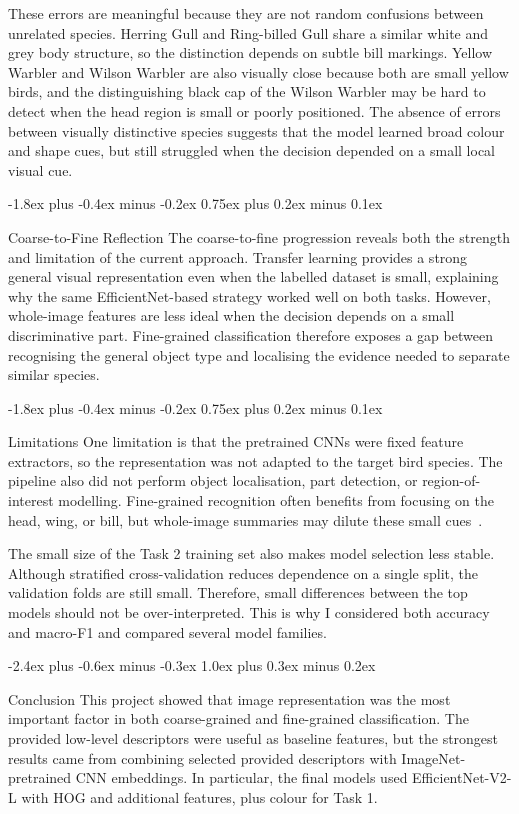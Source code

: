 \documentclass[11pt]{article}
\makeatletter
\renewcommand\section{%
    \@startsection{section}{1}{\z@}%
                  {-2.4ex plus -0.6ex minus -0.3ex}%
                  {1.0ex plus 0.3ex minus 0.2ex}%
                  {\large\bf\raggedright}}
\renewcommand\subsection{%
    \@startsection{subsection}{2}{\z@}%
                  {-1.8ex plus -0.4ex minus -0.2ex}%
                  {0.75ex plus 0.2ex minus 0.1ex}%
                  {\normalsize\bf\raggedright}}
\makeatother
\begin{document}
These errors are meaningful because they are not random confusions between
unrelated species. Herring Gull and Ring-billed Gull share a similar white and grey
body structure, so the distinction depends on subtle bill markings. Yellow Warbler
and Wilson Warbler are also visually close because both are small yellow birds, and
the distinguishing black cap of the Wilson Warbler may be hard to detect when the
head region is small or poorly positioned. The absence of errors between visually
distinctive species suggests that the model learned broad colour and shape cues,
but still struggled when the decision depended on a small local visual cue.

\subsection{Coarse-to-Fine Reflection}
The coarse-to-fine progression reveals both the strength and limitation of the
current approach. Transfer learning provides a strong general visual representation
even when the labelled dataset is small, explaining why the same EfficientNet-based
strategy worked well on both tasks. However, whole-image features are less ideal
when the decision depends on a small discriminative part. Fine-grained
classification therefore exposes a gap between recognising the general object type
and localising the evidence needed to separate similar species.


\subsection{Limitations}
One limitation is that the pretrained CNNs were fixed feature extractors, so the
representation was not adapted to the target bird species. The pipeline also did
not perform object localisation, part detection, or region-of-interest modelling.
Fine-grained recognition often benefits from focusing on the head, wing, or bill,
but whole-image summaries may dilute these small cues~\cite{zhang2014part}.

The small size of the Task 2 training set also makes model selection less stable.
Although stratified cross-validation reduces dependence on a single split, the
validation folds are still small. Therefore, small differences between the top
models should not be over-interpreted. This is why I considered both accuracy and
macro-F1 and compared several model families.


\section{Conclusion}
This project showed that image representation was the most important factor in both coarse-grained and fine-grained classification. 
The provided low-level descriptors were useful as baseline features, but the strongest results came from combining selected provided 
descriptors with ImageNet-pretrained CNN embeddings.
In particular, the final models used EfficientNet-V2-L with HOG and additional features, plus colour for Task 1.
\end{document}
